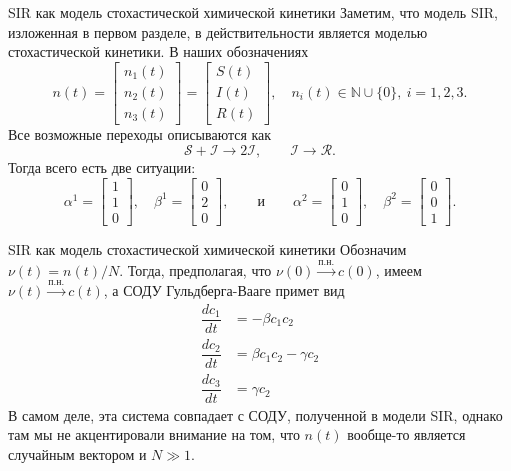 \documentclass[aspectratio=169]{beamer}
\begin{document}
\begin{frame}{SIR как модель стохастической химической кинетики}
    Заметим, что модель SIR, изложенная в первом разделе, в действительности является моделью стохастической кинетики. В наших обозначениях 
    \[ n(t) = \begin{bmatrix} n_1(t) \\ n_2(t) \\ n_3(t) \end{bmatrix} = \begin{bmatrix} S(t) \\ I(t) \\ R(t) \end{bmatrix}, \quad n_i(t) \in \mathbb{N} \cup \{0\}, \ i = 1, 2, 3. \]
    Все возможные переходы описываются как
    \[ \mathcal{S} + \mathcal{I} \to 2 \mathcal{I}, \qquad \mathcal{I} \to \mathcal{R}. \]
    Тогда всего есть две ситуации:
    \[ \alpha^1 = \begin{bmatrix} 1 \\ 1 \\ 0 \end{bmatrix}, \quad \beta^1 = \begin{bmatrix} 0 \\ 2 \\ 0 \end{bmatrix}, \qquad \text{и} \qquad \alpha^2 = \begin{bmatrix} 0 \\ 1 \\ 0 \end{bmatrix}, \quad \beta^2 = \begin{bmatrix} 0 \\ 0 \\ 1 \end{bmatrix}. \]
\end{frame}
\begin{frame}{SIR как модель стохастической химической кинетики}
    Обозначим $\nu(t) = n(t)/N$. Тогда, предполагая, что $\nu(0) \xrightarrow{\text{п.н.}} c(0)$, имеем $\nu(t) \xrightarrow{\text{п.н.}} c(t)$, а СОДУ Гульдберга-Вааге примет вид
    \begin{align*}
        \dfrac{dc_1}{dt} &= - \beta c_1 c_2 \\
        \dfrac{dc_2}{dt} &= \beta c_1 c_2 - \gamma c_2 \\
        \dfrac{dc_3}{dt} &= \gamma c_2
    \end{align*}
    В самом деле, эта система совпадает с СОДУ, полученной в модели SIR, однако там мы не акцентировали внимание на том, что $n(t)$ вообще-то является случайным вектором и $N \gg 1$.
\end{frame}
\end{document}

